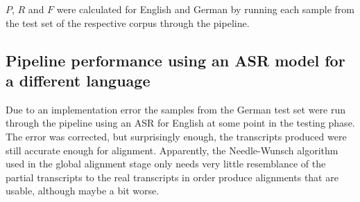 $P$, $R$ and $F$ were calculated for English and German by running each sample from the test set of the respective corpus through the pipeline.

\subsection{Pipeline performance using an \ac{ASR} model for a different language}

Due to an implementation error the samples from the German test set were run through the pipeline using an \ac{ASR} for English at some point in the testing phase. The error was corrected, but surprisingly enough, the transcripts produced were still accurate enough for alignment. Apparently, the Needle-Wunsch algorithm used in the global alignment stage only needs very little resemblance of the partial transcripts to the real transcripts in order produce alignments that are usable, although maybe a bit worse.